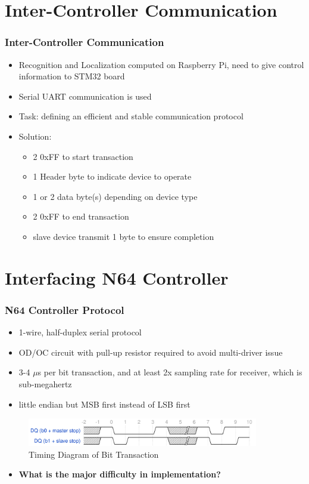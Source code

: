 \documentclass[12pt]{beamer}
\begin{document}
\section{Inter-Controller Communication}
\begin{frame}
    \frametitle{Inter-Controller Communication}
    \begin{itemize}
        \item Recognition and Localization computed on Raspberry Pi, need to give control information to STM32 board
        \item Serial UART communication is used
        \item Task: defining an efficient and stable communication protocol
        \item Solution:
              \begin{itemize}
                  \item 2 0xFF to start transaction
                  \item 1 Header byte to indicate device to operate
                  \item 1 or 2 data byte(s) depending on device type
                  \item 2 0xFF to end transaction
                  \item slave device transmit 1 byte to ensure completion
              \end{itemize}
    \end{itemize}
\end{frame}

\section{Interfacing N64 Controller}
\begin{frame}
    \frametitle{N64 Controller Protocol}
    \begin{itemize}
        \item 1-wire, half-duplex serial protocol
        \item OD/OC circuit with pull-up resistor required to avoid multi-driver issue
        \item 3-4 $\mu$s per bit transaction, and at least 2x sampling rate for receiver, which is sub-megahertz
        \item little endian but MSB first instead of LSB first
    \end{itemize}
    \begin{figure}[H]
        \centering
        \includegraphics[width=0.9\textwidth]{N64_drom.png}
        \caption{Timing Diagram of Bit Transaction}
    \end{figure}
    \begin{itemize}
        \item \textbf{What is the major difficulty in implementation?}
    \end{itemize}
\end{frame}
\end{document}
